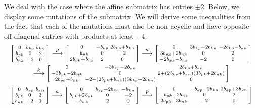 \documentclass{amsart}
\theoremstyle{definition}
\theoremstyle{remark}
\numberwithin{equation}{section}
\newcommand{\0}{{\mathbf{0}}}
\begin{document}
We deal with the case where the affine submatrix has entries $\pm2$.
Below, we display some mutations of the submatrix.
We will derive some inequalities from the fact that each of the mutations must also be non-acyclic and have opposite off-diagonal entries with products at least $-4$.
\begin{multline*}
\begin{bsmallmatrix*}
	0 & b_{kp} & b_{kn} \\
	b_{pk} & 0 & 2 \\
	b_{nk} & -2 & 0
\end{bsmallmatrix*}
\overset{p}{\longrightarrow}
\begin{bsmallmatrix*}
	0 & -b_{kp} & 2b_{kp}+b_{kn} \\
	-b_{pk} & 0 & -2 \\
	2b_{pk}+b_{nk}& 2 & 0
\end{bsmallmatrix*}
\overset{n}{\longrightarrow}
\begin{bsmallmatrix*}
	0 & 3b_{kp}+2b_{kn} & -2b_{kp}-b_{kn} \\
	3b_{pk}+2b_{nk} & 0 & 2 \\
	-2b_{pk}-b_{nk} & -2 & 0
\end{bsmallmatrix*}\\
\overset{k}{\longrightarrow}
\begin{bsmallmatrix*}
	0 & -3b_{kp}-2b_{kn} & 2b_{kp}+b_{kn} \\
	-3b_{pk}-2b_{nk} & 0 & 2+(2b_{kp}+b_{kn})(3b_{pk}+2b_{nk}) \\
	2b_{pk}+b_{nk} & -2-(2b_{pk}+b_{nk})(3b_{kp}+2b_{kn})& 0
\end{bsmallmatrix*}
\end{multline*}
\begin{multline*}
\begin{bsmallmatrix*}
	0 & b_{kp} & b_{kn} \\
	b_{pk} & 0 & 2 \\
	b_{nk} & -2 & 0
\end{bsmallmatrix*}\overset{n}{\longrightarrow}
\begin{bsmallmatrix*}
	0 & b_{kp}+2b_{kn} & -b_{kn} \\
	b_{pk}+2b_{nk} & 0 & -2 \\
	-b_{nk} & 2 & 0
\end{bsmallmatrix*}\overset{p}{\longrightarrow}
\begin{bsmallmatrix*}
	0 & -b_{kp}-2b_{kn} & 2b_{kp}+3b_{kn} \\
	-b_{pk}-2b_{nk} & 0 & 2 \\
	2b_{pk}+3b_{nk} & -2 & 0
\end{bsmallmatrix*}
\end{multline*}
\end{document}
